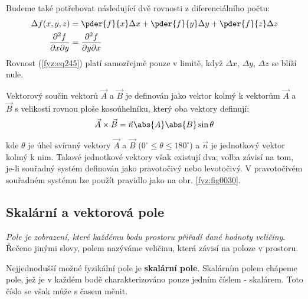       Budeme také potřebovat následující dvě rovnosti z dife\-ren\-ci\-ál\-ní\-ho počtu:
      \begin{subequations} 
        \begin{align} 
          \Delta f(x,y,z)                      
            &=  \pder{f}{x}\Delta x +
                \pder{f}{y}\Delta y + 
                \pder{f}{z}\Delta z                     \label{fyz:eq245}        \\
          \frac{\partial^2f}{\partial x\partial y}
            &=\frac{\partial^2f}{\partial y\partial x}  \label{fyz:eq246}
        \end{align}
      \end{subequations}
      Rovnost (\ref{fyz:eq245}) platí samozřejmě pouze v limitě, když \(\Delta x\), \(\Delta 
      y\), \(\Delta z\) se blíží nule.
      
      Vektorový součin vektorů $\vec{A}$ a $\vec{B}$ je definován jako vektor kolmý k vektorům 
      $\vec{A}$ a $\vec{B}$ s velikostí rovnou ploše kosoúhelníku, který oba vektory definují:
      \begin{equation}\label{fyz:eq247}
        \vec{A}\times\vec{B} = \vec{n}\abs{A}\abs{B}\sin\theta
      \end{equation} 
  
      kde $\theta$ je úhel svíraný vektory $\vec{A}$ a $\vec{B}$ ($0^\circ\leq\theta\leq180^\circ$) a 
      $\vec{n}$ je jednotkový vektor kolmý k nim. Takové jednotkové vektory však existují dva; volba 
      závisí na tom, je-li souřadný systém definován jako pravotočivý nebo levotočivý. V pravotočivém 
      souřadném systému lze použít pravidlo jako na obr. \ref{fyz:fig0030}.
        
    \subsection{Skalární a vektorová pole}\label{fyz:IIchapIIsecIII}
      \emph{Pole je zobrazení, které každému bodu prostoru přiřadí dané hodnoty veličiny}. Řečeno 
      jinými slovy, polem nazýváme veličinu, která závisí na poloze v prostoru.
      
      Nejjednodušší možné fyzikální pole je \textbf{ska\-lá\-rní pole}. Skalárním polem chápeme 
      pole, jež je v každém bodě charakterizováno pouze jedním číslem - skalárem. Toto číslo se 
      však může s časem měnit.
      
